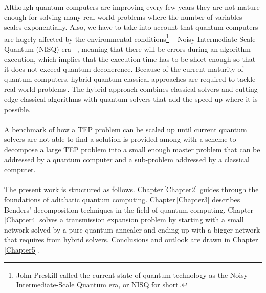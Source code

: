 %
%
Although quantum computers are improving every few years they are not mature enough for solving many real-world problems where the number of variables scales exponentially. Also, we have to take into account that quantum computers are hugely affected by the environmental conditions\footnote{John Preskill called the current state of quantum technology as the Noisy Intermediate-Scale Quantum era, or NISQ for short\,\cite{Preskill2018}.} -- Noisy Intermediate-Scale Quantum (NISQ) era --, meaning that there will be errors during an algorithm execution, which implies that the execution time has to be short enough so that it does not exceed quantum decoherence. Because of the current maturity of quantum computers, hybrid quantum-classical approaches are required to tackle real-world problems\,\cite{Callison2022HybridBeyond}. The hybrid approach combines classical solvers and cutting-edge classical algorithms with quantum solvers that add the speed-up where it is possible.\\\\
A benchmark of how a TEP problem can be scaled up until current quantum solvers are not able to find a solution is provided among with a scheme to decompose a large TEP problem into a small enough master problem that can be addressed by a quantum computer and a sub-problem addressed by a classical computer. \\\\
%
The present work is structured as follows. Chapter\,\ref{Chapter2} guides through the foundations of adiabatic quantum computing. Chapter\,\ref{Chapter3} describes Benders' decomposition techniques in the field of quantum computing. Chapter\,\ref{Chapter4} solves a transmission expansion problem by starting with a small network solved by a pure quantum annealer and ending up with a bigger network that requires from hybrid solvers. Conclusions and outlook are drawn in Chapter\,\ref{Chapter5}.
